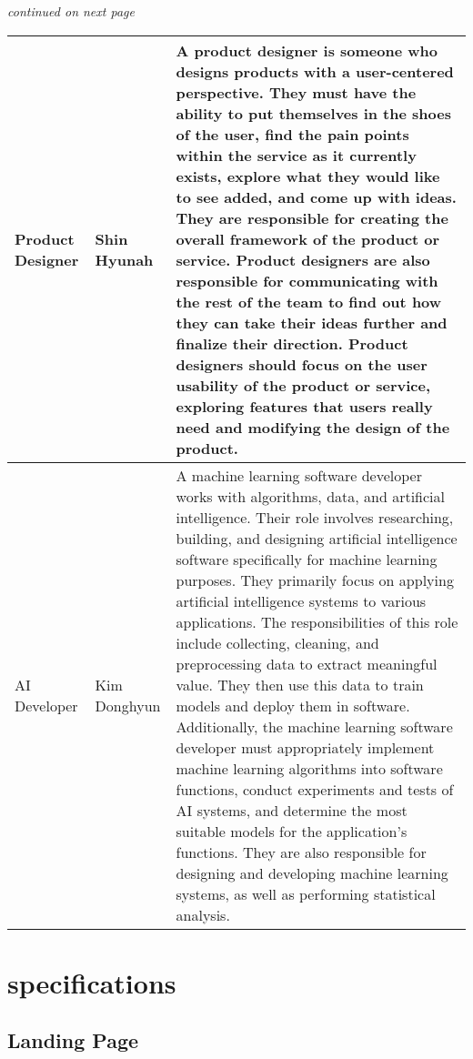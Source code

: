 \documentclass[conference, a4paper]{IEEEtran}
\begin{document}
\textit{continued on next page}
\begin{table}[h]
\begin{tabular}{|p{1cm}|p{1.5cm}|p{5.2cm}|}
\hline
Product Designer & Shin Hyunah & A product designer is someone who designs products with a user-centered perspective. They must have the ability to put themselves in the shoes of the user, find the pain points within the service as it currently exists, explore what they would like to see added, and come up with ideas. They are responsible for creating the overall framework of the product or service. Product designers are also responsible for communicating with the rest of the team to find out how they can take their ideas further and finalize their direction. Product designers should focus on the user usability of the product or service, exploring features that users really need and modifying the design of the product.\\
\hline
AI Developer & Kim Donghyun & A machine learning software developer works with algorithms, data, and artificial intelligence. Their role involves researching, building, and designing artificial intelligence software specifically for machine learning purposes. They primarily focus on applying artificial intelligence systems to various applications. The responsibilities of this role include collecting, cleaning, and preprocessing data to extract meaningful value. They then use this data to train models and deploy them in software. Additionally, the machine learning software developer must appropriately implement machine learning algorithms into software functions, conduct experiments and tests of AI systems, and determine the most suitable models for the application's functions. They are also responsible for designing and developing machine learning systems, as well as performing statistical analysis. \\
\hline
\end{tabular}
\end{table}



\newpage


\section{specifications}


\subsection{Landing Page}
\end{document}
